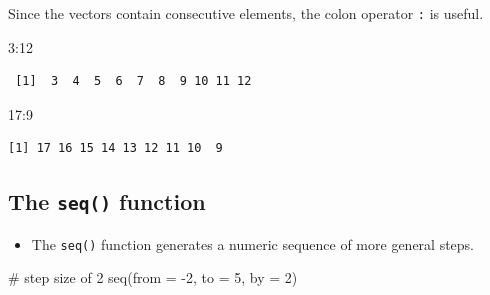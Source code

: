 \documentclass[
  letterpaper,
  DIV=11,
  numbers=noendperiod]{scrreprt}
\newenvironment{Shaded}{\begin{snugshade}}{\end{snugshade}}
\newcommand{\AttributeTok}[1]{\textcolor[rgb]{0.40,0.45,0.13}{#1}}
\newcommand{\CommentTok}[1]{\textcolor[rgb]{0.37,0.37,0.37}{#1}}
\newcommand{\DecValTok}[1]{\textcolor[rgb]{0.68,0.00,0.00}{#1}}
\newcommand{\FunctionTok}[1]{\textcolor[rgb]{0.28,0.35,0.67}{#1}}
\newcommand{\NormalTok}[1]{\textcolor[rgb]{0.00,0.23,0.31}{#1}}
\newcommand{\SpecialCharTok}[1]{\textcolor[rgb]{0.37,0.37,0.37}{#1}}
\providecommand{\tightlist}{%
  \setlength{\itemsep}{0pt}\setlength{\parskip}{0pt}}\usepackage{longtable,booktabs,array}
\begin{document}
\begin{tcolorbox}[enhanced jigsaw, colbacktitle=quarto-callout-tip-color!10!white, opacitybacktitle=0.6, breakable, left=2mm, leftrule=.75mm, toprule=.15mm, toptitle=1mm, bottomtitle=1mm, colframe=quarto-callout-tip-color-frame, opacityback=0, coltitle=black, arc=.35mm, titlerule=0mm, colback=white, bottomrule=.15mm, title=\textcolor{quarto-callout-tip-color}{\faLightbulb}\hspace{0.5em}{Answer}, rightrule=.15mm]

Since the vectors contain consecutive elements, the colon operator
\texttt{:} is useful.

\begin{Shaded}
\begin{Highlighting}[]
\DecValTok{3}\SpecialCharTok{:}\DecValTok{12}   
\end{Highlighting}
\end{Shaded}

\begin{verbatim}
 [1]  3  4  5  6  7  8  9 10 11 12
\end{verbatim}

\begin{Shaded}
\begin{Highlighting}[]
\DecValTok{17}\SpecialCharTok{:}\DecValTok{9}   
\end{Highlighting}
\end{Shaded}

\begin{verbatim}
[1] 17 16 15 14 13 12 11 10  9
\end{verbatim}

\end{tcolorbox}

\subsection{\texorpdfstring{The \texttt{seq()}
function}{The seq() function}}\label{the-seq-function}

\begin{itemize}
\tightlist
\item
  The \texttt{seq()} function generates a numeric sequence of more
  general steps.
\end{itemize}

\begin{Shaded}
\begin{Highlighting}[]
\CommentTok{\# step size of 2}
\FunctionTok{seq}\NormalTok{(}\AttributeTok{from =} \SpecialCharTok{{-}}\DecValTok{2}\NormalTok{, }\AttributeTok{to =} \DecValTok{5}\NormalTok{, }\AttributeTok{by =} \DecValTok{2}\NormalTok{)            }
\end{Highlighting}
\end{Shaded}
\end{document}
